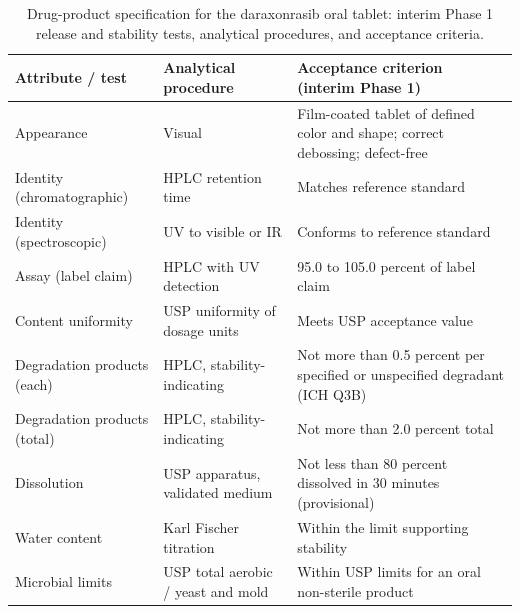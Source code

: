 \begin{table}[t]
\centering
\caption{Drug-product specification for the daraxonrasib oral tablet: interim
Phase 1 release and stability tests, analytical procedures, and acceptance
criteria.}
\label{tab:cmc-dp-spec}
\begin{tabularx}{\textwidth}{L{4.0cm} L{4.0cm} Y}
\toprule
\textbf{Attribute / test} & \textbf{Analytical procedure} & \textbf{Acceptance criterion (interim Phase 1)} \\
\midrule
Appearance & Visual & Film-coated tablet of defined color and shape; correct debossing; defect-free \\
Identity (chromatographic) & HPLC retention time & Matches reference standard \\
Identity (spectroscopic) & UV to visible or IR & Conforms to reference standard \\
Assay (label claim) & HPLC with UV detection & 95.0 to 105.0 percent of label claim \\
Content uniformity & USP uniformity of dosage units & Meets USP acceptance value \\
Degradation products (each) & HPLC, stability-indicating & Not more than 0.5 percent per specified or unspecified degradant (ICH Q3B) \\
Degradation products (total) & HPLC, stability-indicating & Not more than 2.0 percent total \\
Dissolution & USP apparatus, validated medium & Not less than 80 percent dissolved in 30 minutes (provisional) \\
Water content & Karl Fischer titration & Within the limit supporting stability \\
Microbial limits & USP total aerobic / yeast and mold & Within USP limits for an oral non-sterile product \\
\bottomrule
\end{tabularx}
\end{table}

